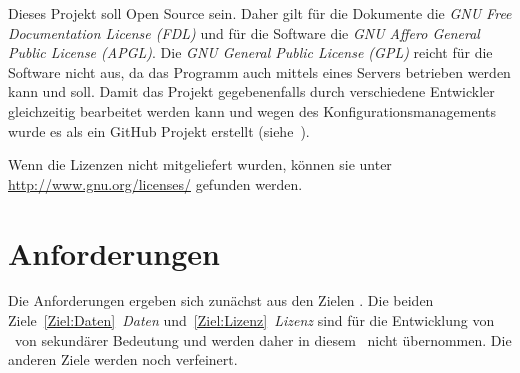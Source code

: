 Dieses Projekt soll Open Source sein.
Daher gilt für die Dokumente die \emph{GNU Free Documentation License (FDL)} und für die Software die \emph{GNU Affero General Public License (APGL)}.
Die \emph{GNU General Public License (GPL)} reicht für die Software nicht aus, da das Programm auch mittels eines Servers betrieben werden kann und soll.
Damit das Projekt gegebenenfalls durch verschiedene Entwickler gleichzeitig bearbeitet werden kann und wegen des Konfigurationsmanagements wurde es als ein GitHub Projekt erstellt (siehe~\cite{bib:ASBA}).

Wenn die Lizenzen nicht mitgeliefert wurden, können sie unter \url{http://www.gnu.org/licenses/} gefunden werden.

\section{Anforderungen}%
\label{sec:Anforderungen}

Die Anforderungen ergeben sich zunächst aus den Zielen .
Die beiden Ziele~\ref{Ziel:Daten}~\emph{Daten} und~\ref{Ziel:Lizenz}~\emph{Lizenz} sind für die Entwicklung von \ASBA\ von sekundärer Bedeutung und werden daher in diesem \sectionname\ nicht übernommen.
Die anderen Ziele werden noch verfeinert.

